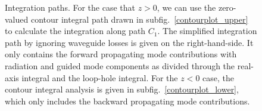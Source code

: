 \documentclass[]{report}
\begin{document}
\begin{figure}
\begin{minipage}{.91\linewidth}
\centering
{}
\end{minipage}
\par\medskip
\begin{minipage}{.91\linewidth}
\centering
{}
\end{minipage}
\caption{Integration paths. For the case that $ z>0 $, we can use the zero-valued contour integral path drawn in subfig.~\ref{contourplot_upper} to calculate the integration along path $ C_1 $. The simplified integration path by ignoring waveguide losses is given on the right-hand-side. It only contains the forward propagating mode contributions with radiation and guided mode components as divided through the real-axis integral and the loop-hole integral. For the $ z<0 $ case, the contour integral analysis is given in subfig.~\ref{contourplot_lower}, which only includes the backward propagating mode contributions.}
\label{fig:integralpath}
\end{figure}
\end{document}
